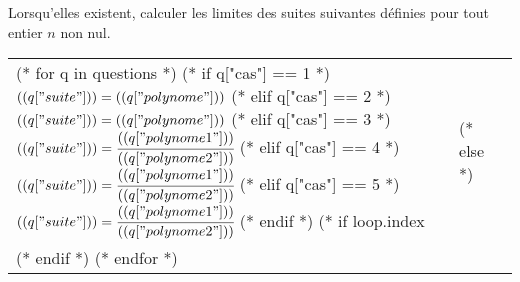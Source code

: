 \exercice
Lorsqu'elles existent, calculer les limites des suites suivantes définies pour tout entier $n$ non nul.\par
\begin{tabularx}{\linewidth}[t]{XXX}
  (* for q in questions *)
    (* if q["cas"] == 1 *)
    $(( q["suite"] )) = (( q["polynome"] ))$
    (* elif q["cas"] == 2 *)
    $(( q["suite"] )) = (( q["polynome"] ))$
    (* elif q["cas"] == 3 *)
    $(( q["suite"] )) = \cfrac{(( q["polynome1"] ))}{(( q["polynome2"] ))}$
    (* elif q["cas"] == 4 *)
    $(( q["suite"] )) = \cfrac{(( q["polynome1"] ))}{(( q["polynome2"] ))}$
    (* elif q["cas"] == 5 *)
    $(( q["suite"] )) = \cfrac{(( q["polynome1"] ))}{(( q["polynome2"] ))}$
    (* endif *)
    (* if loop.index %
    &
    (* else *)
    \\
    (* endif *)
  (* endfor *)
\end{tabularx}
